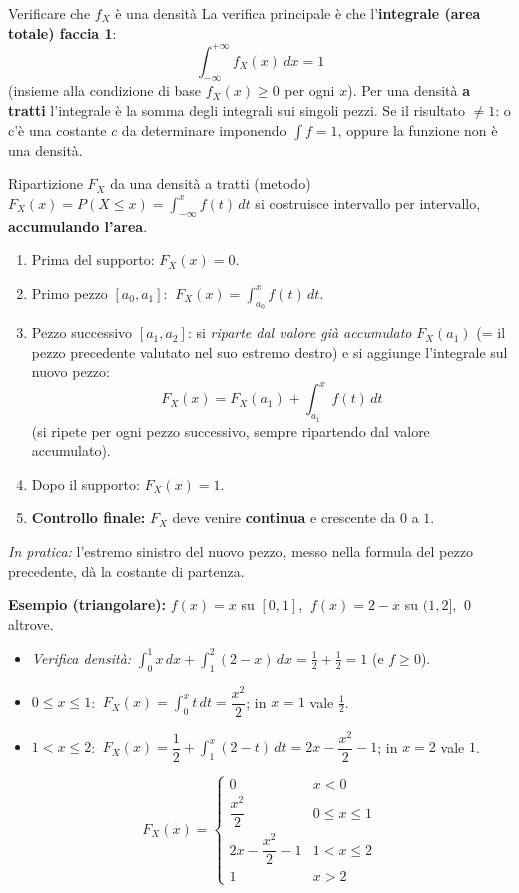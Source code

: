 \documentclass[11pt]{article}
\begin{document}
\begin{concetto}[barGreen]{Verificare che $f_X$ \`e una densit\`a}
La verifica principale \`e che l'\textbf{integrale (area totale) faccia 1}:
\[ \boxed{\ \int_{-\infty}^{+\infty} f_X(x)\,dx = 1\ } \]
(insieme alla condizione di base $f_X(x) \ge 0$ per ogni $x$). Per una densit\`a \textbf{a tratti} l'integrale \`e la somma degli integrali sui singoli pezzi. Se il risultato $\neq 1$: o c'\`e una costante $c$ da determinare imponendo $\int f = 1$, oppure la funzione non \`e una densit\`a.
\end{concetto}

\begin{concetto}[barGreen]{Ripartizione $F_X$ da una densit\`a a tratti (metodo)}
$F_X(x)=P(X\le x)=\int_{-\infty}^{x} f(t)\,dt$ si costruisce intervallo per intervallo, \textbf{accumulando l'area}.
\begin{enumerate}
\item Prima del supporto: $F_X(x)=0$.
\item Primo pezzo $[a_0,a_1]$: $\ F_X(x)=\displaystyle\int_{a_0}^{x} f(t)\,dt$.
\item Pezzo successivo $[a_1,a_2]$: si \emph{riparte dal valore gi\`a accumulato} $F_X(a_1)$ (= il pezzo precedente valutato nel suo estremo destro) e si aggiunge l'integrale sul nuovo pezzo:
\[ F_X(x)=F_X(a_1)+\int_{a_1}^{x} f(t)\,dt \]
(si ripete per ogni pezzo successivo, sempre ripartendo dal valore accumulato).
\item Dopo il supporto: $F_X(x)=1$.
\item \textbf{Controllo finale:} $F_X$ deve venire \textbf{continua} e crescente da $0$ a $1$.
\end{enumerate}
\emph{In pratica:} l'estremo sinistro del nuovo pezzo, messo nella formula del pezzo precedente, d\`a la costante di partenza.

\textbf{Esempio (triangolare):} $f(x)=x$ su $[0,1]$, $\ f(x)=2-x$ su $(1,2]$, $\ 0$ altrove.
\begin{itemize}[leftmargin=1.2em,itemsep=1pt,topsep=2pt]
\item \emph{Verifica densit\`a:} $\int_0^1 x\,dx + \int_1^2 (2-x)\,dx = \tfrac12+\tfrac12 = 1$ \checkmark \; (e $f\ge0$).
\item $0\le x\le1$: $\ F_X(x)=\int_0^x t\,dt = \dfrac{x^2}{2}$; \; in $x=1$ vale $\tfrac12$.
\item $1<x\le2$: $\ F_X(x)=\dfrac12+\int_1^x (2-t)\,dt = 2x-\dfrac{x^2}{2}-1$; \; in $x=2$ vale $1$.
\end{itemize}
\[ F_X(x)=\begin{cases} 0 & x<0 \\[2pt] \dfrac{x^2}{2} & 0\le x\le 1 \\[4pt] 2x-\dfrac{x^2}{2}-1 & 1<x\le 2 \\[4pt] 1 & x>2 \end{cases} \]
\end{concetto}
\end{document}
